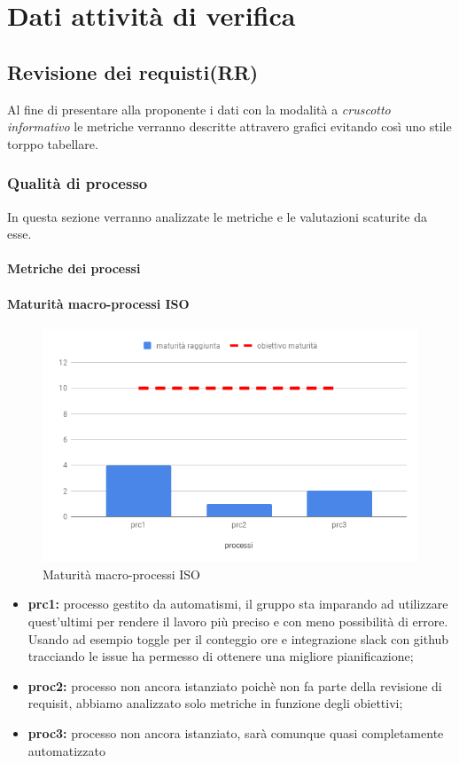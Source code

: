 \appendix
\section{Dati attività di verifica}
\subsection{Revisione dei requisti(RR)}
Al fine di presentare alla proponente i dati con la modalità a \textit{cruscotto informativo} le metriche verranno descritte attravero grafici evitando così uno stile torppo tabellare.
\subsubsection{Qualità di processo}
In questa sezione verranno analizzate le metriche e le valutazioni scaturite da esse.
\paragraph{Metriche dei processi}
\paragraph{Maturità macro-processi ISO}
\hspace{15cm}
\begin{figure}[h!]
	\centering
	\includegraphics[scale=0.5]{MaturitaProcessi.png}
	\caption{Maturità macro-processi ISO}
\end{figure}
\begin{itemize}
	\item \textbf{prc1:} processo gestito da automatismi, il gruppo sta imparando ad utilizzare quest'ultimi per rendere il lavoro più preciso e con meno possibilità di errore. Usando ad esempio toggle per il conteggio ore e integrazione slack con github tracciando le issue ha
	permesso di ottenere una migliore pianificazione;
	\item \textbf{proc2:} processo non ancora istanziato poichè non fa parte della revisione di requisit, abbiamo analizzato solo metriche in funzione degli obiettivi;
	\item \textbf{proc3:} processo non ancora istanziato, sarà comunque quasi completamente automatizzato
\end{itemize}
